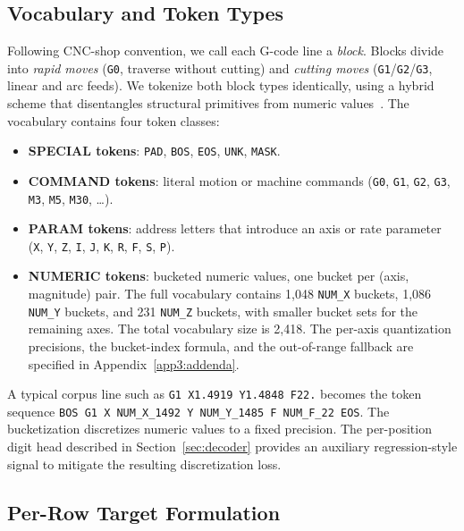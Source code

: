 \documentclass[sensors,article,submit,moreauthors,pdftex]{Definitions/mdpi}
\begin{document}
\subsection{Vocabulary and Token Types}
\label{sec:problem-vocab}

Following CNC-shop convention, we call each G-code line a \emph{block}. Blocks divide into \emph{rapid moves} (\texttt{G0}, traverse without cutting) and \emph{cutting moves} (\texttt{G1}/\texttt{G2}/\texttt{G3}, linear and arc feeds). We tokenize both block types identically, using a hybrid scheme that disentangles structural primitives from numeric values~\cite{grammar_paper,gcode_foundational}. The vocabulary contains four token classes:
\begin{itemize}
\item \textbf{SPECIAL tokens}: \texttt{PAD}, \texttt{BOS}, \texttt{EOS}, \texttt{UNK}, \texttt{MASK}.
\item \textbf{COMMAND tokens}: literal motion or machine commands (\texttt{G0}, \texttt{G1}, \texttt{G2}, \texttt{G3}, \texttt{M3}, \texttt{M5}, \texttt{M30}, \ldots).
\item \textbf{PARAM tokens}: address letters that introduce an axis or rate parameter (\texttt{X}, \texttt{Y}, \texttt{Z}, \texttt{I}, \texttt{J}, \texttt{K}, \texttt{R}, \texttt{F}, \texttt{S}, \texttt{P}).
\item \textbf{NUMERIC tokens}: bucketed numeric values, one bucket per (axis, magnitude) pair. The full vocabulary contains 1{,}048 \texttt{NUM\_X} buckets, 1{,}086 \texttt{NUM\_Y} buckets, and 231 \texttt{NUM\_Z} buckets, with smaller bucket sets for the remaining axes. The total vocabulary size is 2{,}418. The per-axis quantization precisions, the bucket-index formula, and the out-of-range fallback are specified in Appendix~\ref{app3:addenda}.
\end{itemize}

A typical corpus line such as \texttt{G1 X1.4919 Y1.4848 F22.} becomes the token sequence \texttt{BOS G1 X NUM\_X\_1492 Y NUM\_Y\_1485 F NUM\_F\_22 EOS}. The bucketization discretizes numeric values to a fixed precision. The per-position digit head described in Section~\ref{sec:decoder} provides an auxiliary regression-style signal to mitigate the resulting discretization loss.

\subsection{Per-Row Target Formulation}
\label{sec:per-row}
\end{document}
